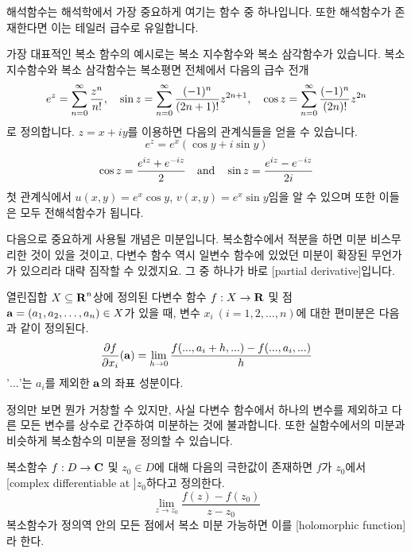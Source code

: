 \documentclass[11pt]{book}
\begin{document}
\begin{MLPar}
해석함수는 해석학에서 가장 중요하게 여기는 함수 중 하나입니다.
또한 해석함수가 존재한다면 이는 테일러 급수로 유일합니다.

\example
가장 대표적인 복소 함수의 예시로는 복소 지수함수와 복소 삼각함수가 있습니다.
복소 지수함수와 복소 삼각함수는 복소평면 전체에서 다음의 급수 전개
\[
e^z = \sumz{n} \frac{z^n}{n!} \qc
\sin z  = \sumz{n} \frac{(-1)^n}{(2n+1)!}z^{2n+1} \qc
\cos z  = \sumz{n} \frac{(-1)^n}{(2n)!}z^{2n}
\]
로 정의합니다.
\(z = x + iy\)를 이용하면 다음의 관계식들을 얻을 수 있습니다.
\[e^{z} = e^{x}(\cos y + i\sin y)\]
\[\cos z = \frac{e^{iz}+e^{-iz}}{2} \qand \sin z = \frac{e^{iz} - e^{-iz}}{2i}\]
첫 관계식에서 \(u(x, y) = e^x \cos y\), \(v(x, y) = e^x \sin y\)임을 알 수 있으며 또한 이들은 모두 전해석함수가 됩니다.

다음으로 중요하게 사용될 개념은 미분입니다.
복소함수에서 적분을 하면 미분 비스무리한 것이 있을 것이고, 다변수 함수 역시 일변수 함수에 있었던 미분이 확장된 무언가가 있으리라 대략 짐작할 수 있겠지요.
그 중 하나가 바로 [partial derivative]입니다.
\end{MLPar}

\begin{MLDef}[편미분]
열린집합 \(X \subseteq \mbox{$\mathbf R$}^n\)상에 정의된 다변수 함수 \(f: X \rightarrow \mbox{$\mathbf R$}\) 및 점 \(\vb{a} = (a_1, a_2, \ldots, a_n) \in X\)가 있을 때, 변수 \(x_i\ (i=1, 2, \ldots, n)\)에 대한 편미분은 다음과 같이 정의된다.
\[\frac{\partial f}{\partial x_i} ( \vb{a} ) = \lim_{h \to 0} \frac{f(..., a_i + h, ...) - f(..., a_i, ...)}{h}\]
'\(\ldots\)'는 \(a_i\)를 제외한 \(\vb{a}\)의 좌표 성분이다.
\end{MLDef}

\begin{MLPar}
정의만 보면 뭔가 거창할 수 있지만, 사실 다변수 함수에서 하나의 변수를 제외하고 다른 모든 변수를 상수로 간주하여 미분하는 것에 불과합니다.
또한 실함수에서의 미분과 비슷하게 복소함수의 미분을 정의할 수 있습니다.
\end{MLPar}

\begin{MLDef}[복소함수의 미분]
복소함수 \(f:D\rightarrow\mbox{$\mathbf C$}\) 및 $z_0\in D$에 대해 다음의 극한값이 존재하면 \(f\)가 \(z_0\)에서 [complex differentiable at ]{\footnotesize \(z_0\)}하다고 정의한다.
\[\lim_{z \to z_0} \frac{f(z) - f(z_0)}{z-z_0}\]
복소함수가 정의역 안의 모든 점에서 복소 미분 가능하면 이를 [holomorphic function]라 한다.
\end{MLDef}
\end{document}
